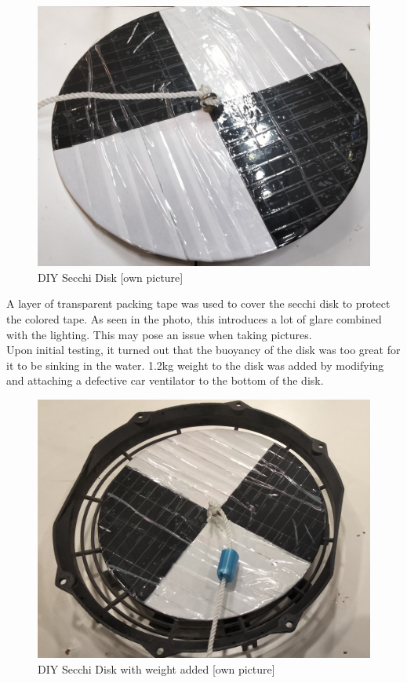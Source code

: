 \begin{figure}[h]
\centering
\includegraphics[scale=0.1]{070_design/package/54_secchi.jpg}
\caption{\gls{DIY} Secchi Disk [own picture]}
\end{figure}

A layer of transparent packing tape was used to cover the secchi disk to protect the colored tape. As seen in the photo, this introduces a lot of glare combined with the lighting. This may pose an issue when taking pictures.\\

Upon initial testing, it turned out that the buoyancy of the disk was too great for it to be sinking in the water. 1.2\gls{kg} weight to the disk was added by modifying and attaching a defective car ventilator to the bottom of the disk.

\begin{figure}[h]
\centering
\includegraphics[scale=0.1]{070_design/package/55_disk.jpg}
\caption{\gls{DIY} Secchi Disk with weight added [own picture]}
\end{figure}